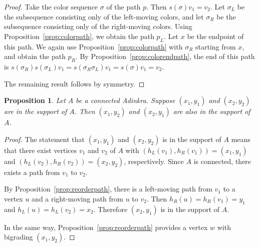 \documentclass[12pt,twoside,singlespace]{article}
\numberwithin{equation}{section}
\newtheorem{prop}[equation]{Proposition}
\theoremstyle{definition}
\begin{document}
\begin{proof}
Take the color sequence $\sigma$ of the path $p$.  Then $s(\sigma)v_1=v_2$.  Let $\sigma_L$ be the subsequence consisting only of the left-moving colors, and let $\sigma_R$ be the subsequence consisting only of the right-moving colors.  Using Proposition~\ref{prop:colorpath}, we obtain the path $p_L$.  Let $x$ be the endpoint of this path.  We again use Proposition~\ref{prop:colorpath} with $\sigma_R$ starting from $x$, and obtain the path $p_R$.  By Proposition~\ref{prop:colorendpath}, the end of this path is $s(\sigma_R)s(\sigma_L)v_1=s(\sigma_R\sigma_L)v_1=s(\sigma)v_1=v_2$.

The remaining result follows by symmetry.
\end{proof}


\begin{prop}
\label{prop:rectangle-completion}
Let $A$ be a connected Adinkra.  Suppose $(x_1,y_1)$ and $(x_2,y_2)$ are in the support of $A$.  Then $(x_1,y_2)$ and $(x_2,y_1)$ are also in the support of $A$.
\end{prop}
\begin{proof}
The statement that $(x_1,y_1)$ and $(x_2,y_2)$ is in the support of $A$ means that there exist vertices $v_1$ and $v_2$ of $A$ with $(h_L(v_1),h_R(v_1))=(x_1,y_1)$ and $(h_L(v_2),h_R(v_2))=(x_2,y_2)$, respectively.  Since $A$ is connected, there exists a path from $v_1$ to $v_2$.

By Proposition~\ref{prop:reorderpath}, there is a left-moving path from $v_1$ to a vertex $u$ and a right-moving path from $u$ to $v_2$.  Then $h_R(u)=h_R(v_1)=y_1$ and $h_L(u)=h_L(v_2)=x_2$.  Therefore $(x_2,y_1)$ is in the support of $A$.

In the same way, Proposition~\ref{prop:reorderpath} provides a vertex $w$ with bigrading $(x_1,y_2)$.
\end{proof}
\end{document}
